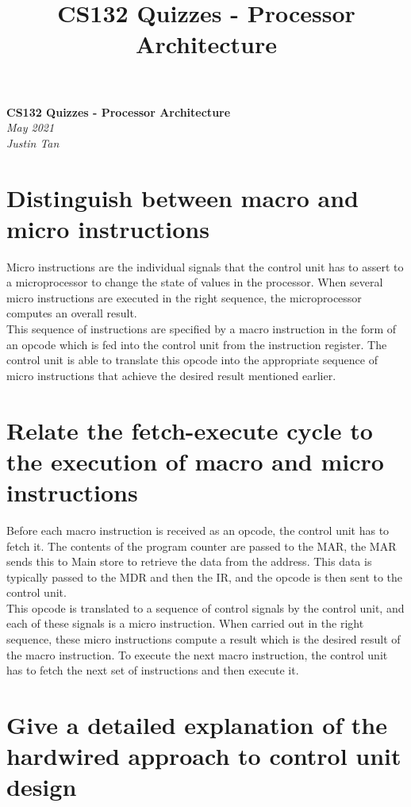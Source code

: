 \documentclass{article}
\title{CS132 Quizzes - Processor Architecture}
\begin{document}
\begin{center}
    \Huge\textbf{CS132 Quizzes - Processor Architecture}\\
    \huge\textit{May 2021}\\
    \medskip
    \Large\textit{Justin Tan}
\end{center}



\section{Distinguish between macro and micro instructions}

Micro instructions are the individual signals that the control unit has to
assert to a microprocessor to change the state of values in the processor. When
several micro instructions are executed in the right sequence, the
microprocessor computes an overall result. \\
This sequence of instructions are specified by a macro instruction in the form
of an opcode which is fed into the control unit from the instruction register.
The control unit is able to translate this opcode into the appropriate sequence
of micro instructions that achieve the desired result mentioned earlier.

\section{Relate the fetch-execute cycle to the execution of macro and micro instructions}

Before each macro instruction is received as an opcode, the control unit has to fetch it. The contents of the program counter are passed to the MAR, the MAR sends this to Main store to retrieve the data from the address. This data is typically passed to the MDR and then the IR, and the opcode is then sent to the control unit. \\
This opcode is translated to a sequence of control signals by the control unit, and each of these signals is a micro instruction. When carried out in the right sequence, these micro instructions compute a result which is the desired result of the macro instruction. To execute the next macro instruction, the control unit has to fetch the next set of instructions and then execute it.


\section{Give a detailed explanation of the hardwired approach to control unit design}
\end{document}
